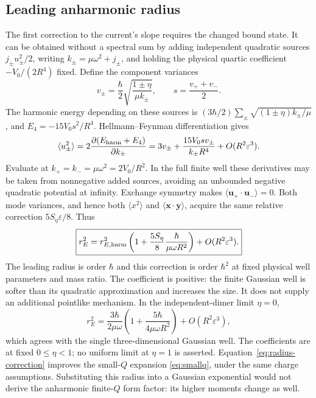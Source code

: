 \subsection{Leading anharmonic radius}
\label{sec:anharmonic-radius}
The first correction to the current's slope requires the changed bound state.
It can be obtained without a spectral sum by adding independent quadratic
sources $j_\pm u_\pm^2/2$, writing $k_\pm=\mu\omega^2+j_\pm$, and
holding the physical quartic coefficient $-V_0/(2R^4)$ fixed. Define the component variances
\begin{equation}
 v_\pm=\frac{\hbar}{2}\sqrt{\frac{1\pm\eta}{\mu k_\pm}},
 \qquad s=\frac{v_++v_-}{2}.
\end{equation}
The harmonic energy depending on these sources is
$(3\hbar/2)\sum_\pm\sqrt{(1\pm\eta)k_\pm/\mu}$, and
$E_4=-15V_0s^2/R^4$. Hellmann--Feynman differentiation gives
\begin{equation}
 \langle u_\pm^2\rangle
 =2\frac{\partial(E_{\rm harm}+E_4)}{\partial k_\pm}
 =3v_\pm+\frac{15V_0s v_\pm}{k_\pm R^4}
 +O(R^2\varepsilon^3).
\end{equation}
Evaluate at $k_+=k_-=\mu\omega^2=2V_0/R^2$.
In the full finite well these derivatives may be taken from nonnegative
added sources, avoiding an unbounded negative quadratic potential at infinity.
Exchange symmetry makes $\langle\mathbf u_+\cdot\mathbf u_-\rangle=0$.
Both mode variances, and hence both $\langle x^2\rangle$ and
$\langle\mathbf x\cdot\mathbf y\rangle$, acquire the same relative
correction $5S_\eta\varepsilon/8$. Thus
\begin{equation}
 \boxed{r_E^2=r_{E,{\rm harm}}^2
 \left(1+\frac{5S_\eta}{8}\frac{\hbar}{\mu\omega R^2}\right)
 +O(R^2\varepsilon^3).}
 \label{eq:radius-correction}
\end{equation}
The leading radius is order $\hbar$ and this correction is order $\hbar^2$
at fixed physical well parameters and mass ratio. The coefficient is positive:
the finite Gaussian well is softer than its quadratic approximation and
increases the size. It does not supply an additional pointlike mechanism.
In the independent-dimer limit $\eta=0$,
\begin{equation}
 r_E^2=\frac{3\hbar}{2\mu\omega}
 \left(1+\frac{5\hbar}{4\mu\omega R^2}\right)
 +O(R^2\varepsilon^3),
\end{equation}
which agrees with the single three-dimensional Gaussian well. The coefficients
are at fixed $0\leq\eta<1$; no uniform limit at $\eta=1$ is asserted.
Equation~\eqref{eq:radius-correction} improves the small-$Q$ expansion
\eqref{eq:smallq}, under the same charge assumptions. Substituting this radius
into a Gaussian exponential would not derive the anharmonic finite-$Q$
form factor: its higher moments change as well.

